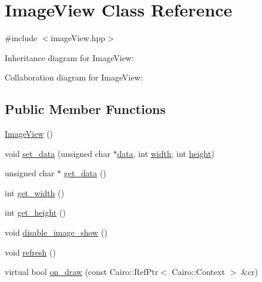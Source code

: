 \hypertarget{class_image_view}{}\section{Image\+View Class Reference}
\label{class_image_view}


{\ttfamily \#include $<$image\+View.\+hpp$>$}



Inheritance diagram for Image\+View\+:


Collaboration diagram for Image\+View\+:
\subsection*{Public Member Functions}
\begin{DoxyCompactItemize}
\item 
\hyperlink{class_image_view_a8382a8ee74d8ff437f0be6cffc2ba957}{Image\+View} ()
\item 
void \hyperlink{class_image_view_a34baa17952c6cbc4374f1bb6bdbbd757}{set\+\_\+data} (unsigned char $\ast$\hyperlink{class_image_view_aafc2f72cb5d3cbc5f23eb303b30982da}{data}, int \hyperlink{class_image_view_a5a491c5256173430d4b16d9abea80727}{width}, int \hyperlink{class_image_view_a3e4a6ddf0a10ae710405cdd6e73924f6}{height})
\item 
unsigned char $\ast$ \hyperlink{class_image_view_af3323f3942cccd3faea6ddd549c3759f}{get\+\_\+data} ()
\item 
int \hyperlink{class_image_view_a2bbc02fd7818b11ef0caa13f95ac300c}{get\+\_\+width} ()
\item 
int \hyperlink{class_image_view_ac39cc5773b4611c5835d9b62512531cc}{get\+\_\+height} ()
\item 
void \hyperlink{class_image_view_a52c3ac86c941bcdfdd4fd8c711e53184}{disable\+\_\+image\+\_\+show} ()
\item 
void \hyperlink{class_image_view_a1c14fbed1a32a6f159c9916b6bd04d0a}{refresh} ()
\item 
virtual bool \hyperlink{class_image_view_a4a09cb2c02f13ca6ed325cc023634ff9}{on\+\_\+draw} (const Cairo\+::\+Ref\+Ptr$<$ Cairo\+::\+Context $>$ \&cr)
\end{DoxyCompactItemize}
